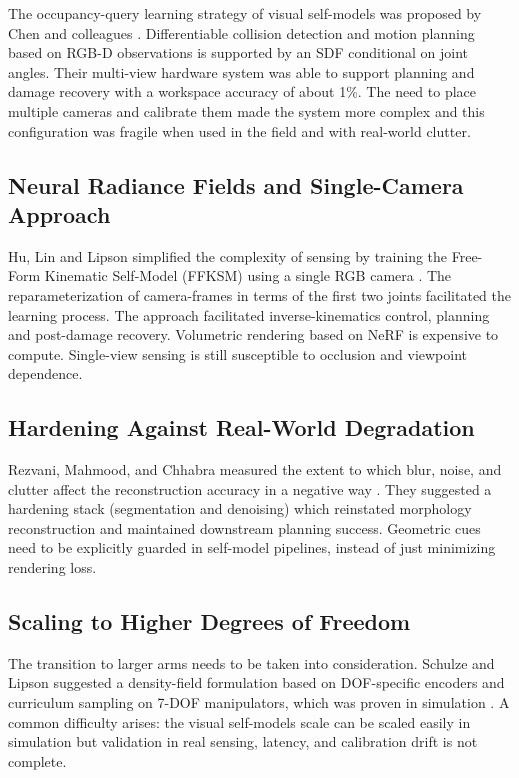 \documentclass[11pt,a4paper]{article}
\begin{document}
The occupancy-query learning strategy of visual self-models was proposed by Chen and colleagues \cite{chen2022full}. Differentiable collision detection and motion planning based on RGB-D observations is supported by an SDF conditional on joint angles. Their multi-view hardware system was able to support planning and damage recovery with a workspace accuracy of about 1\%. The need to place multiple cameras and calibrate them made the system more complex and this configuration was fragile when used in the field and with real-world clutter.

\subsection{Neural Radiance Fields and Single-Camera Approach}

Hu, Lin and Lipson simplified the complexity of sensing by training the Free-Form Kinematic Self-Model (FFKSM) using a single RGB camera \cite{hu2024teaching}. The reparameterization of camera-frames in terms of the first two joints facilitated the learning process. The approach facilitated inverse-kinematics control, planning and post-damage recovery. Volumetric rendering based on NeRF is expensive to compute. Single-view sensing is still susceptible to occlusion and viewpoint dependence.

\subsection{Hardening Against Real-World Degradation}

Rezvani, Mahmood, and Chhabra measured the extent to which blur, noise, and clutter affect the reconstruction accuracy in a negative way \cite{rezvani2024robust}. They suggested a hardening stack (segmentation and denoising) which reinstated morphology reconstruction and maintained downstream planning success. Geometric cues need to be explicitly guarded in self-model pipelines, instead of just minimizing rendering loss.

\subsection{Scaling to Higher Degrees of Freedom}

The transition to larger arms needs to be taken into consideration. Schulze and Lipson suggested a density-field formulation based on DOF-specific encoders and curriculum sampling on 7-DOF manipulators, which was proven in simulation \cite{schulze2024high}. A common difficulty arises: the visual self-models scale can be scaled easily in simulation but validation in real sensing, latency, and calibration drift is not complete.
\end{document}
